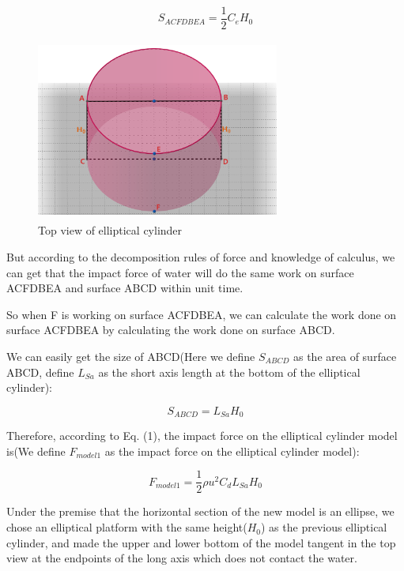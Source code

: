 \documentclass[13pt]{ctexart}
\begin{document}
	\begin{equation}
	S_{ACFDBEA} = \frac{1}{2}  C_e  H_0
	\label{eq_pagerank}
	\end{equation}
	
	\clearpage
	\begin {figure}[htb]
	\centering %
	\includegraphics[width=8cm,height=6cm]{Top_v1.png}
	\caption{Top view of  elliptical cylinder} %
	\label{spread_rate}
	\end {figure}
	
	But according to the decomposition rules of force and knowledge of calculus, we can get that the impact force of water will do the same work on surface ACFDBEA and surface ABCD within unit time.
	
	So when F is working on surface ACFDBEA, we can calculate the work done on surface ACFDBEA by calculating  the work done on surface ABCD.
	
	We can easily get the size of ABCD(Here we define $S_{ABCD}$ as the area of surface ABCD, define $L_{Sa}$ as the short axis length at the bottom of the elliptical cylinder):
	
	\begin{equation}
	S_{ABCD} = L_{Sa}  H_0
	\label{eq_pagerank}
	\end{equation}
	
	Therefore, according to Eq. (1), the impact force on the elliptical cylinder model is(We define $F_{model1}$ as the impact force on the elliptical cylinder model):
	
	\begin{equation}
	F_{model1} = \frac{1}{2}  {\rho}  {u^{2}}  C_{d}  L_{Sa}  H_0
	\label{eq_pagerank}
	\end{equation}
	
	
	Under the premise that the horizontal section of the new model is an ellipse, we chose an elliptical platform with the same height($H_0$) as the previous elliptical cylinder, and made the upper and lower bottom of the model tangent in the top view at the endpoints of the long axis which does not contact the water.
	
\end{document}
